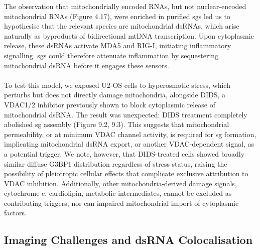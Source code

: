 The observation that mitochondrially encoded RNAs, but not nuclear-encoded mitochondrial RNAs (Figure 4.17), were enriched in purified \gls{sg}s led us to hypothesise that the relevant species are mitochondrial dsRNAs, which arise naturally as byproducts of bidirectional mtDNA transcription\cite{dsouza_mitochondrial_2018}. Upon cytoplasmic release, these dsRNAs activate MDA5 and RIG-I, initiating inflammatory signalling\cite{dhir_mitochondrial_2018}. \gls{sg}s could therefore attenuate inflammation by sequestering mitochondrial dsRNA before it engages these sensors.
\\
\\
To test this model, we exposed U2-OS cells to hyperosmotic stress, which perturbs but does not directly damage mitochondria\cite{ikizawa_mitochondria_2023}, alongside DIDS, a VDAC1/2 inhibitor previously shown to block cytoplasmic release of mitochondrial dsRNA\cite{krieger_trafficking_2024}. The result was unexpected: DIDS treatment completely abolished \gls{sg} assembly (Figure 9.2, 9.3). This suggests that mitochondrial permeability, or at minimum VDAC channel activity, is required for \gls{sg} formation, implicating mitochondrial dsRNA export, or another VDAC-dependent signal, as a potential trigger. We note, however, that DIDS-treated cells showed broadly similar diffuse G3BP1 distribution regardless of stress status, raising the possibility of pleiotropic cellular effects that complicate exclusive attribution to VDAC inhibition. Additionally, other mitochondria-derived damage signals, cytochrome c, cardiolipin, metabolic intermediates, cannot be excluded as contributing triggers, nor can impaired mitochondrial import of cytoplasmic factors.

\subsection{Imaging Challenges and dsRNA Colocalisation}

